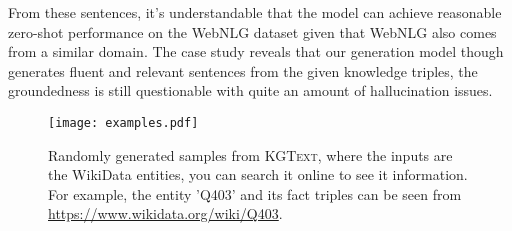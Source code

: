 \documentclass[11pt,a4paper]{article}
\newcommand{\dataset}{\textsc{KGText}\xspace}
\begin{document}
From these sentences, it's understandable that the model can achieve reasonable zero-shot performance on the WebNLG dataset given that WebNLG also comes from a similar domain. The case study reveals that our generation model though generates fluent and relevant sentences from the given knowledge triples, the groundedness is still questionable with quite an amount of hallucination issues. 

\begin{figure*}[!tbh]
    \centering
    \texttt{[image: examples.pdf]}
    \caption{Randomly generated samples from \dataset, where the inputs are the WikiData entities, you can search it online to see it information. For example, the entity 'Q403' and its fact triples can be seen from \url{https://www.wikidata.org/wiki/Q403}. }
    \label{fig:examples}
\end{figure*}
\end{document}
